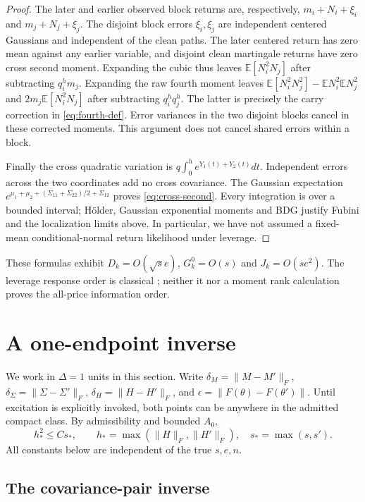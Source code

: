 \documentclass[11pt,a4paper]{amsart}
\theoremstyle{plain}
\theoremstyle{definition}
\theoremstyle{remark}
\newcommand{\EE}{\mathbb{E}}
\begin{document}
\begin{proof}
The later and earlier observed block returns are, respectively,
$m_i+N_i+\xi_i$ and $m_j+N_j+\xi_j$.
The disjoint block errors $\xi_i,\xi_j$ are independent centered Gaussians
and independent of the clean paths. The later centered return has zero
mean against any earlier variable, and disjoint clean martingale returns
have zero cross second moment. Expanding the cubic thus leaves
$\EE[N_i^2N_j]$ after subtracting $q_i^hm_j$.
Expanding the raw fourth moment leaves
$\EE[N_i^2N_j^2]-\EE N_i^2\EE N_j^2$ and
$2m_j\EE[N_i^2N_j]$ after subtracting $q_i^h q_j^h$.
The latter is precisely the carry correction in \eqref{eq:fourth-def}.
Error variances in the two disjoint blocks cancel in these corrected
moments. This argument does not cancel shared errors within a block.

Finally the cross quadratic variation is
$q\int_0^h e^{Y_1(t)+Y_2(t)}dt$. Independent errors across the two
coordinates add no cross covariance. The Gaussian expectation
$e^{\mu_1+\mu_2+(\Sigma_{11}+\Sigma_{22})/2+\Sigma_{12}}$
proves \eqref{eq:cross-second}. Every integration is over a bounded
interval; H\"older, Gaussian exponential moments and BDG justify Fubini
and the localization limits above. In particular, we have not assumed a
fixed-mean conditional-normal return likelihood under leverage.
\end{proof}

These formulas exhibit $D_k=O(\sqrt{s}e)$, $G_k^0=O(s)$ and
$J_k=O(se^2)$. The leverage response order is classical
\cite{MasoliverPerello2005,ADR2025journal}; neither it nor a moment rank
calculation proves the all-price information order.

\section{A one-endpoint inverse}\label{sec:inverse}

We work in $\Delta=1$ units in this section. Write
$\delta_M=\|M-M'\|_F$, $\delta_\Sigma=\|\Sigma-\Sigma'\|_F$,
$\delta_H=\|H-H'\|_F$, and $\epsilon=\|F(\theta)-F(\theta')\|$.
Until excitation is explicitly invoked, both points can be anywhere in
the admitted compact class. By admissibility and bounded $A_0$,
\begin{equation}\label{eq:H-small}
 h_*^2\le C s_*,\qquad
 h_*=\max(\|H\|_F,\|H'\|_F),\quad s_*=\max(s,s').
\end{equation}
All constants below are independent of the true $s,e,n$.

\subsection{The covariance-pair inverse}
\end{document}
